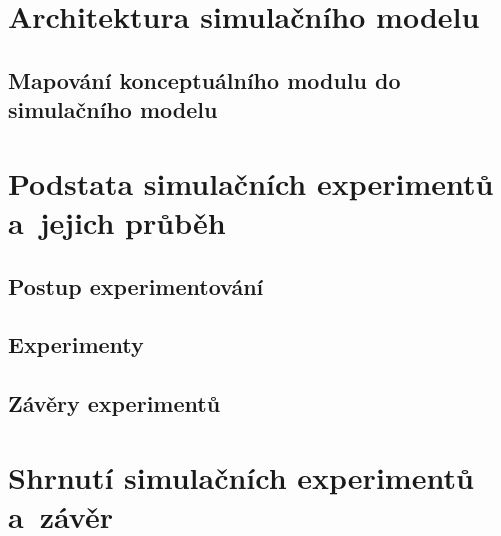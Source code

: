 \documentclass[a4paper, 11pt]{article}
\begin{document}
	\section{Architektura simulačního modelu}


	\subsection{Mapování konceptuálního modulu do simulačního modelu}



	\section{Podstata simulačních experimentů a~jejich průběh}


	\subsection{Postup experimentování}


	\subsection{Experimenty}


	\subsection{Závěry experimentů}



	\section{Shrnutí simulačních experimentů a~závěr}



	\clearpage
	
	\renewcommand{\refname}{Literatura}
	



	\clearpage
	\appendix
\end{document}
